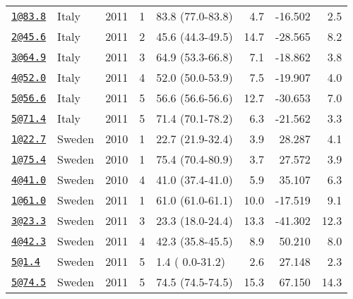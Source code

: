\documentclass[]{article}
\begin{document}
\begin{longtable}[]{@{}llrrlrrr@{}}
\href{mailto:1@83.8}{\nolinkurl{1@83.8}} & Italy & 2011 & 1 & 83.8
(77.0-83.8) & 4.7 & -16.502 & 2.5\tabularnewline
\href{mailto:2@45.6}{\nolinkurl{2@45.6}} & Italy & 2011 & 2 & 45.6
(44.3-49.5) & 14.7 & -28.565 & 8.2\tabularnewline
\href{mailto:3@64.9}{\nolinkurl{3@64.9}} & Italy & 2011 & 3 & 64.9
(53.3-66.8) & 7.1 & -18.862 & 3.8\tabularnewline
\href{mailto:4@52.0}{\nolinkurl{4@52.0}} & Italy & 2011 & 4 & 52.0
(50.0-53.9) & 7.5 & -19.907 & 4.0\tabularnewline
\href{mailto:5@56.6}{\nolinkurl{5@56.6}} & Italy & 2011 & 5 & 56.6
(56.6-56.6) & 12.7 & -30.653 & 7.0\tabularnewline
\href{mailto:5@71.4}{\nolinkurl{5@71.4}} & Italy & 2011 & 5 & 71.4
(70.1-78.2) & 6.3 & -21.562 & 3.3\tabularnewline
\href{mailto:1@22.7}{\nolinkurl{1@22.7}} & Sweden & 2010 & 1 & 22.7
(21.9-32.4) & 3.9 & 28.287 & 4.1\tabularnewline
\href{mailto:1@75.4}{\nolinkurl{1@75.4}} & Sweden & 2010 & 1 & 75.4
(70.4-80.9) & 3.7 & 27.572 & 3.9\tabularnewline
\href{mailto:4@41.0}{\nolinkurl{4@41.0}} & Sweden & 2010 & 4 & 41.0
(37.4-41.0) & 5.9 & 35.107 & 6.3\tabularnewline
\href{mailto:1@61.0}{\nolinkurl{1@61.0}} & Sweden & 2011 & 1 & 61.0
(61.0-61.1) & 10.0 & -17.519 & 9.1\tabularnewline
\href{mailto:3@23.3}{\nolinkurl{3@23.3}} & Sweden & 2011 & 3 & 23.3
(18.0-24.4) & 13.3 & -41.302 & 12.3\tabularnewline
\href{mailto:4@42.3}{\nolinkurl{4@42.3}} & Sweden & 2011 & 4 & 42.3
(35.8-45.5) & 8.9 & 50.210 & 8.0\tabularnewline
\href{mailto:5@1.4}{\nolinkurl{5@1.4}} & Sweden & 2011 & 5 & 1.4 (
0.0-31.2) & 2.6 & 27.148 & 2.3\tabularnewline
\href{mailto:5@74.5}{\nolinkurl{5@74.5}} & Sweden & 2011 & 5 & 74.5
(74.5-74.5) & 15.3 & 67.150 & 14.3\tabularnewline
\bottomrule
\end{longtable}

\newpage
\end{document}
